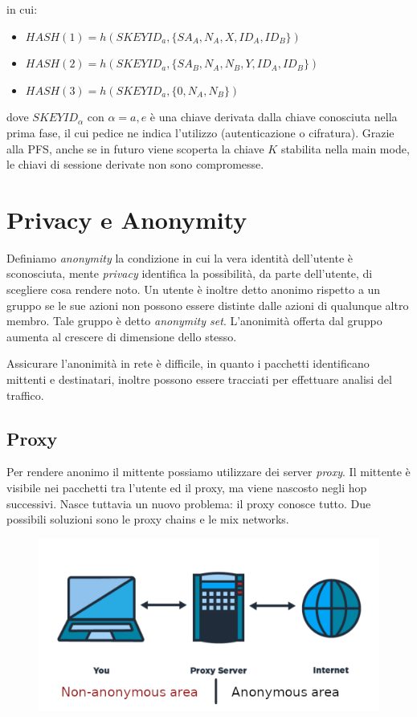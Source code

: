 \documentclass[a4paper, 11pt, twoside, openright, fleqn]{report}
\begin{document}
in cui:
\begin{itemize}
	\item $HASH(1) = h(SKEYID_a,\{SA_A,N_A,X,ID_A,ID_B\})$
	\item $HASH(2) = h(SKEYID_a,\{SA_B,N_A,N_B,Y,ID_A,ID_B\})$
	\item $HASH(3) = h(SKEYID_a,\{0,N_A,N_B\})$
\end{itemize}
dove $SKEYID_\alpha$ con $\alpha=a,e$ è una chiave derivata dalla chiave conosciuta nella prima fase, il cui pedice ne indica l'utilizzo (autenticazione o cifratura). Grazie alla PFS, anche se in futuro viene scoperta la chiave $K$ stabilita nella main mode, le chiavi di sessione derivate non sono compromesse.


\chapter{Privacy e Anonymity}
Definiamo \emph{anonymity} la condizione in cui la vera identità dell'utente è sconosciuta, mente \emph{privacy} identifica la possibilità, da parte dell'utente, di scegliere cosa rendere noto. Un utente è inoltre detto anonimo rispetto a un gruppo se le sue azioni non possono essere distinte dalle azioni di qualunque altro membro. Tale gruppo è detto \emph{anonymity set}. L'anonimità offerta dal gruppo aumenta al crescere di dimensione dello stesso.

Assicurare l'anonimità in rete è difficile, in quanto i pacchetti identificano mittenti e destinatari, inoltre possono essere tracciati per effettuare analisi del traffico.

\section{Proxy}
Per rendere anonimo il mittente possiamo utilizzare dei server \emph{proxy}. Il mittente è visibile nei pacchetti tra l'utente ed il proxy, ma viene nascosto negli hop successivi. Nasce tuttavia un nuovo problema: il proxy conosce tutto. Due possibili soluzioni sono le proxy chains e le mix networks.
\begin{figure}[htp]
	\centering
	\includegraphics[width=.7\textwidth]{images/proxy2}
\end{figure}
\end{document}
